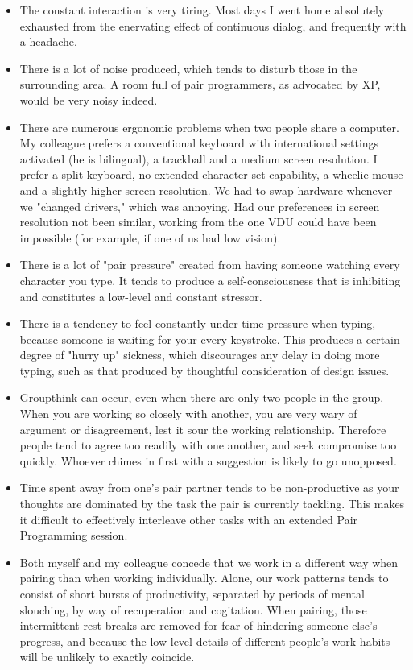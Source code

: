 \documentclass{article}
\begin{document}
\begin{enumerate}
\begin{itemize}
\item The constant interaction is very tiring. Most days I went home
absolutely exhausted from the enervating effect of continuous dialog,
and frequently with a headache.\\
\item There is a lot of noise produced, which tends to disturb those in the
surrounding area. A room full of pair programmers, as advocated by
XP, would be very noisy indeed.\\
\item There are numerous ergonomic problems when two people share a
computer. My colleague prefers a conventional keyboard with
international settings activated (he is bilingual), a trackball and a
medium screen resolution. I prefer a split keyboard, no extended
character set capability, a wheelie mouse and a slightly higher
screen resolution. We had to swap hardware whenever we "changed
drivers," which was annoying. Had our preferences in screen
resolution not been similar, working from the one VDU could have been
impossible (for example, if one of us had low vision).\\
\item There is a lot of "pair pressure" created from having someone
watching every character you type. It tends to produce a
self-consciousness that is inhibiting and constitutes a low-level and
constant stressor.\\
\item There is a tendency to feel constantly under time pressure when
typing, because someone is waiting for your every keystroke. This
produces a certain degree of "hurry up" sickness, which discourages
any delay in doing more typing, such as that produced by thoughtful
consideration of design issues.\\
\item Groupthink can occur, even when there are only two people in the
group. When you are working so closely with another, you are very
wary of argument or disagreement, lest it sour the working
relationship. Therefore people tend to agree too readily with one
another, and seek compromise too quickly. Whoever chimes in first
with a suggestion is likely to go unopposed.\\
\item Time spent away from one's pair partner tends to be non-productive as
your thoughts are dominated by the task the pair is currently
tackling. This makes it difficult to effectively interleave other
tasks with an extended Pair Programming session.\\
\item Both myself and my colleague concede that we work in a different way
when pairing than when working individually. Alone, our work patterns
tends to consist of short bursts of productivity, separated by
periods of mental slouching, by way of recuperation and cogitation.
When pairing, those intermittent rest breaks are removed for fear of
hindering someone else's progress, and because the low level details
of different people's work habits will be unlikely to exactly
coincide.
\end{itemize}


\end{enumerate}
\end{document}
